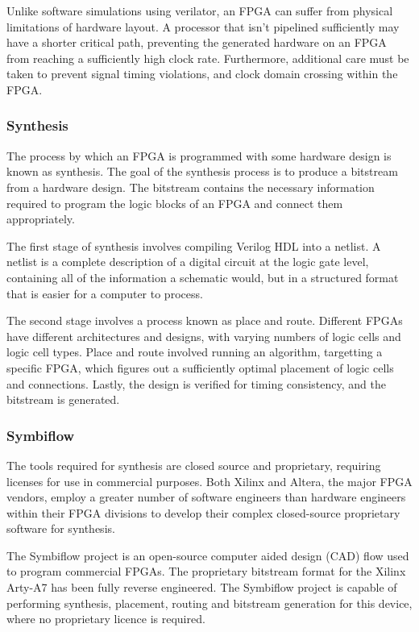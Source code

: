 \documentclass[a4paper,8pt]{report}
\begin{document}
Unlike software simulations using verilator, an FPGA can suffer from physical
limitations of hardware layout. A processor that isn't pipelined sufficiently
may have a shorter critical path, preventing the generated hardware on an FPGA
from reaching a sufficiently high clock rate. Furthermore, additional care must
be taken to prevent signal timing violations, and clock domain crossing within
the FPGA.


\subsubsection{Synthesis}
The process by which an FPGA is programmed with some hardware design is known
as synthesis. The goal of the synthesis process is to produce a bitstream from a
hardware design. The bitstream contains the necessary information required to
program the logic blocks of an FPGA and connect them appropriately.

The first stage of synthesis involves compiling Verilog HDL into a netlist.
A netlist is a complete description of a digital circuit at the logic gate
level, containing all of the information a schematic would, but in a structured
format that is easier for a computer to process.

The second stage involves a process known as place and route. Different FPGAs
have different architectures and designs, with varying numbers of logic cells
and logic cell types. Place and route involved running an algorithm, targetting
a specific FPGA, which figures out a sufficiently optimal placement of logic
cells and connections. Lastly, the design is verified for timing consistency,
and the bitstream is generated.

\subsubsection{Symbiflow}
The tools required for synthesis are closed source and proprietary, requiring
licenses for use in commercial purposes. Both Xilinx and Altera, the major FPGA
vendors, employ a greater number of software engineers than hardware engineers
within their FPGA divisions to develop their complex closed-source proprietary
software for synthesis.

The Symbiflow project\cite{symbiflow} is an open-source computer aided design (CAD) flow used to
program commercial FPGAs. The proprietary bitstream format for the Xilinx
Arty-A7 has been fully reverse engineered.
The Symbiflow project is capable of performing synthesis, placement, routing
and bitstream generation for this device, where no proprietary licence is required. 
\end{document}
